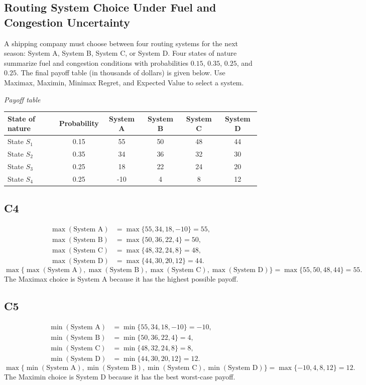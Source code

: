 \begin{ExamProblems}
		\subsection*{Routing System Choice Under Fuel and Congestion Uncertainty}
		A shipping company must choose between four routing systems for the next season: System A, System B,
		System C, or System D. Four states of nature summarize fuel and congestion conditions
		with probabilities $0.15$, $0.35$, $0.25$, and $0.25$. The final payoff table (in thousands of dollars)
		is given below. Use Maximax, Maximin, Minimax Regret, and Expected Value to select a system.
		
		\begin{center}
			\textit{Payoff table} \\
			\begin{tabular}{l c c c c c}
				\toprule
				State of nature & Probability & System A & System B & System C & System D \\
				\midrule
				State $S_1$ & 0.15 & 55 & 50 & 48 & 44 \\
				State $S_2$ & 0.35 & 34 & 36 & 32 & 30 \\
				State $S_3$ & 0.25 & 18 & 22 & 24 & 20 \\
				State $S_4$ & 0.25 & -10 & 4 & 8 & 12 \\
				\bottomrule
			\end{tabular}
		\end{center}
		
		\subsection*{C4}
		\[
		\begin{aligned}
		\max(\text{System A}) &= \max\{55,34,18,-10\} = 55,\\
		\max(\text{System B}) &= \max\{50,36,22,4\} = 50,\\
		\max(\text{System C}) &= \max\{48,32,24,8\} = 48,\\
		\max(\text{System D}) &= \max\{44,30,20,12\} = 44.
		\end{aligned}
		\]
		\[
		\max\{\max(\text{System A}), \max(\text{System B}), \max(\text{System C}), \max(\text{System D})\}
		= \max\{55, 50, 48, 44\}
		= 55.
		\]
		The Maximax choice is System A because it has the highest possible payoff.
		
		\subsection*{C5}
		\[
		\begin{aligned}
		\min(\text{System A}) &= \min\{55,34,18,-10\} = -10,\\
		\min(\text{System B}) &= \min\{50,36,22,4\} = 4,\\
		\min(\text{System C}) &= \min\{48,32,24,8\} = 8,\\
		\min(\text{System D}) &= \min\{44,30,20,12\} = 12.
		\end{aligned}
		\]
		\[
		\max\{\min(\text{System A}), \min(\text{System B}), \min(\text{System C}), \min(\text{System D})\}
		= \max\{-10, 4, 8, 12\}
		= 12.
		\]
		The Maximin choice is System D because it has the best worst-case payoff.
		

\end{ExamProblems}
